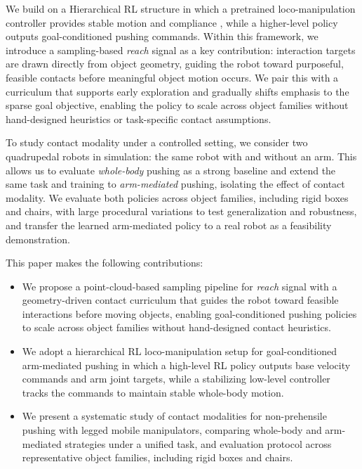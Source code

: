 We build on a Hierarchical RL structure in which a pretrained loco-manipulation controller provides stable motion and compliance \cite{Kumar2021RMA}, while a higher-level policy outputs goal-conditioned pushing commands. Within this framework, we introduce a sampling-based \emph{reach} signal as a key contribution: interaction targets are drawn directly from object geometry, guiding the robot toward purposeful, feasible contacts before meaningful object motion occurs. We pair this with a curriculum that supports early exploration and gradually shifts emphasis to the sparse goal objective, enabling the policy to scale across object families without hand-designed heuristics or task-specific contact assumptions.

To study contact modality under a controlled setting, we consider two quadrupedal robots in simulation: the same robot with and without an arm. This allows us to evaluate \emph{whole-body} pushing as a strong baseline and extend the same task and training %
to \emph{arm-mediated} pushing, isolating the effect of contact modality. We evaluate both policies across object families, including rigid boxes and chairs, with large procedural variations to test generalization and robustness, and transfer the learned arm-mediated policy to a real robot as a feasibility demonstration. %


This paper makes the following contributions:
\begin{itemize}[leftmargin=*]
\item We propose a point-cloud-based sampling pipeline for \emph{reach} signal with a geometry-driven contact curriculum that guides the robot toward feasible interactions before %
moving objects,
enabling goal-conditioned pushing policies to scale across object families without hand-designed contact heuristics.

\item We adopt a hierarchical RL loco-manipulation setup for goal-conditioned arm-mediated pushing in which a high-level RL policy outputs  base velocity commands and arm joint targets, while a stabilizing low-level controller tracks the commands to maintain stable whole-body motion.

\item We present a systematic study of contact modalities for non-prehensile pushing with legged mobile manipulators, comparing whole-body and arm-mediated strategies under a unified task, 
and evaluation protocol across representative object families, including rigid boxes and chairs.
\end{itemize}

